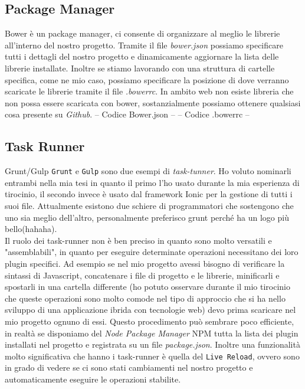 \subsection{Package Manager}
Bower è un package manager, ci consente di organizzare al meglio le librerie all'interno del nostro progetto. Tramite il file \emph{bower.json} possiamo specificare tutti i dettagli del nostro progetto e dinamicamente aggiornare la lista delle librerie installate. Inoltre se stiamo lavorando con una struttura di cartelle specifica, come ne mio caso, possiamo specificare la posizione di dove verranno scaricate le librerie tramite il file \emph{.bowerrc}. In ambito web non esiste libreria che non possa essere scaricata con bower, sostanzialmente possiamo ottenere qualsiasi cosa presente su \emph{Github}.
-- Codice Bower.json --
-- Codice .bowerrc --

\subsection{Task Runner}

Grunt/Gulp \texttt{Grunt} e \texttt{Gulp} sono due esempi di \emph{task-tunner}. Ho voluto nominarli entrambi nella mia tesi in quanto il primo l'ho usato durante la mia esperienza di tirocinio, il secondo invece è usato dal framework  Ionic per la gestione di tutti i suoi file. Attualmente esistono due schiere di programmatori che sostengono che uno sia meglio dell'altro, personalmente preferisco grunt perché ha un logo più bello(hahaha).\\
Il ruolo dei task-runner non è ben preciso in quanto sono molto versatili e "assemblabili", in quanto per eseguire determinate operazioni necessitano dei loro plugin specifici. Ad esempio se nel mio progetto avessi bisogno di verificare la sintassi di Javascript, concatenare i file di progetto e le librerie, minificarli e spostarli in una cartella differente (ho potuto osservare durante il mio tirocinio che queste operazioni sono molto comode nel tipo di approccio che si ha nello sviluppo di una applicazione ibrida con tecnologie web) devo prima scaricare nel mio progetto ognuno di essi. Questo procedimento può sembrare poco efficiente, in realtà se disponiamo del \emph{Node Package Manager} NPM tutta la lista dei plugin installati nel progetto e registrata su un file \emph{package.json}. Inoltre una funzionalità molto significativa che hanno i task-runner è quella del \texttt{Live Reload}, ovvero sono in grado di vedere se ci sono stati cambiamenti nel nostro progetto e automaticamente eseguire le operazioni stabilite.

